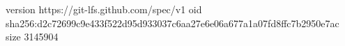 version https://git-lfs.github.com/spec/v1
oid sha256:d2c72699c9e433f522d95d933037c6aa27e6e06a677a1a07fd8ffc7b2950e7ac
size 3145904
